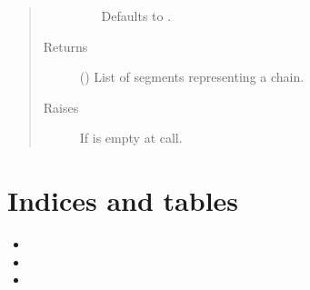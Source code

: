\documentclass[letterpaper,10pt,english]{sphinxmanual}
\begin{document}
\begin{fulllineitems}
\begin{fulllineitems}
\begin{quote}
\begin{description}
\begin{itemize}
Defaults to .


\end{itemize}

\item[{Returns}] \leavevmode
{} () \textendash{} List of segments representing a chain.

\item[{Raises}] \leavevmode
{} \textendash{} If  is empty at call.

\end{description}\end{quote}

\end{fulllineitems}


\end{fulllineitems}



\chapter{Indices and tables}
\label{\detokenize{index:indices-and-tables}}\begin{itemize}
\item {} 

\item {} 

\item {} 

\end{itemize}


\renewcommand{\indexname}{Python Module Index}
\begin{sphinxtheindex}
\let\bigletter\sphinxstyleindexlettergroup
\bigletter{c}
\item\relax{}
\item\relax{}
\item\relax{}
\item\relax{}
\end{sphinxtheindex}

\renewcommand{\indexname}{Index}
\printindex
\end{document}
